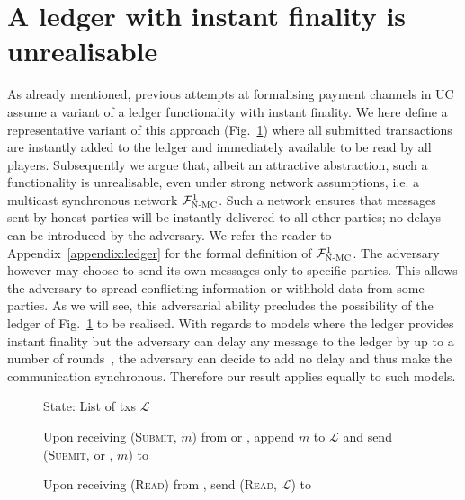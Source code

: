 \section{A ledger with instant finality is unrealisable}
\label{sec:perfect-ledger}
  As already mentioned, previous attempts at formalising payment channels in
  UC~\cite{DBLP:conf/ccs/DziembowskiFH18,perun,Malavolta:2017:CPP:3133956.3134096,sprites}
  assume a variant of a ledger functionality with instant finality. We here
  define a representative variant of this approach \perfectledger{}
  (Fig.~\ref{fig:perfectledger:func}) where all submitted transactions are
  instantly added to the ledger and immediately available to be read by all
  players. Subsequently we argue that, albeit an attractive abstraction, such a
  functionality is unrealisable, even under strong network assumptions, i.e. a
  multicast synchronous network $\mathcal{F}_{\textsc{N-MC}}^1$.
  Such a network ensures that messages sent by honest parties will be instantly
  delivered to all other parties; no delays can be introduced by the adversary.
  We refer the reader to Appendix~\ref{appendix:ledger} for the formal
  definition of $\mathcal{F}_{\textsc{N-MC}}^1$. The adversary however may choose to send its
  own messages only to specific parties. This allows the adversary to spread
  conflicting information or withhold data from some parties. As we will see,
  this adversarial ability precludes the possibility of the ledger of
  Fig.~\ref{fig:perfectledger:func} to be realised. With regards to models where
  the ledger provides instant finality but the adversary can delay any message
  to the ledger by up to a number of
  rounds~\cite{DBLP:conf/ccs/DziembowskiFH18}, the adversary can decide to add
  no delay and thus make the communication synchronous. Therefore our result
  applies equally to such models.

  \begin{figure}[H]
    \begin{systembox}{\perfectledger}
      \begin{algorithmic}[1]
        \State State: List of txs $\mathcal{L}$
        \Statex

        \State Upon receiving (\textsc{Submit}, $m$) from \alice{} or
        \adversary, append $m$ to $\mathcal{L}$ and send (\textsc{Submit},
        \alice{} or \adversary, $m$) to \adversary
        \Statex

        \State Upon receiving (\textsc{Read}) from \alice, send (\textsc{Read},
        $\mathcal{L}$) to \alice
      \end{algorithmic}
    \end{systembox}
    \caption{}
    \label{fig:perfectledger:func}
  \end{figure}

